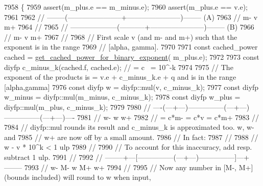 \begin{DoxyCode}
7958 \{
7959     assert(m\_plus.e == m\_minus.e);
7960     assert(m\_plus.e == v.e);
7961 
7962     \textcolor{comment}{//  --------(-----------------------+-----------------------)--------    (A)}
7963     \textcolor{comment}{//          m-                      v                       m+}
7964     \textcolor{comment}{//}
7965     \textcolor{comment}{//  --------------------(-----------+-----------------------)--------    (B)}
7966     \textcolor{comment}{//                      m-          v                       m+}
7967     \textcolor{comment}{//}
7968     \textcolor{comment}{// First scale v (and m- and m+) such that the exponent is in the range}
7969     \textcolor{comment}{// [alpha, gamma].}
7970 
7971     \textcolor{keyword}{const} cached\_power cached = \hyperlink{namespacenlohmann_1_1detail_1_1dtoa__impl_adbf329a18c5cf854a3477327afd2200b}{get\_cached\_power\_for\_binary\_exponent}(
      m\_plus.e);
7972 
7973     \textcolor{keyword}{const} diyfp c\_minus\_k(cached.f, cached.e); \textcolor{comment}{// = c ~= 10^-k}
7974 
7975     \textcolor{comment}{// The exponent of the products is = v.e + c\_minus\_k.e + q and is in the range [alpha,gamma]}
7976     \textcolor{keyword}{const} diyfp w       = diyfp::mul(v,       c\_minus\_k);
7977     \textcolor{keyword}{const} diyfp w\_minus = diyfp::mul(m\_minus, c\_minus\_k);
7978     \textcolor{keyword}{const} diyfp w\_plus  = diyfp::mul(m\_plus,  c\_minus\_k);
7979 
7980     \textcolor{comment}{//  ----(---+---)---------------(---+---)---------------(---+---)----}
7981     \textcolor{comment}{//          w-                      w                       w+}
7982     \textcolor{comment}{//          = c*m-                  = c*v                   = c*m+}
7983     \textcolor{comment}{//}
7984     \textcolor{comment}{// diyfp::mul rounds its result and c\_minus\_k is approximated too. w, w- and}
7985     \textcolor{comment}{// w+ are now off by a small amount.}
7986     \textcolor{comment}{// In fact:}
7987     \textcolor{comment}{//}
7988     \textcolor{comment}{//      w - v * 10^k < 1 ulp}
7989     \textcolor{comment}{//}
7990     \textcolor{comment}{// To account for this inaccuracy, add resp. subtract 1 ulp.}
7991     \textcolor{comment}{//}
7992     \textcolor{comment}{//  --------+---[---------------(---+---)---------------]---+--------}
7993     \textcolor{comment}{//          w-  M-                  w                   M+  w+}
7994     \textcolor{comment}{//}
7995     \textcolor{comment}{// Now any number in [M-, M+] (bounds included) will round to w when input,}

\end{DoxyCode}
